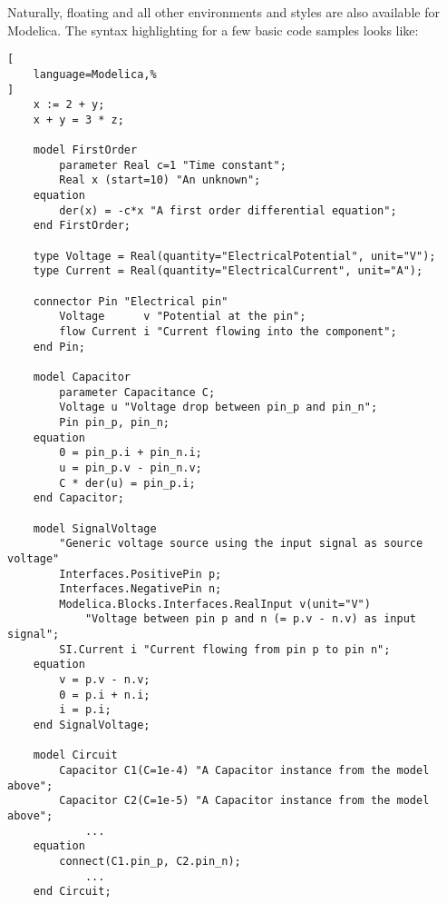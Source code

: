 Naturally, floating and all other environments and styles are also available for
Modelica.
The syntax highlighting for a few basic code samples \autocite{wikipedia_modelica_2020} looks like:

\begin{lstlisting}[
    language=Modelica,%
]
    x := 2 + y;
    x + y = 3 * z;

    model FirstOrder
        parameter Real c=1 "Time constant";
        Real x (start=10) "An unknown";
    equation
        der(x) = -c*x "A first order differential equation";
    end FirstOrder;

    type Voltage = Real(quantity="ElectricalPotential", unit="V");
    type Current = Real(quantity="ElectricalCurrent", unit="A");

    connector Pin "Electrical pin"
        Voltage      v "Potential at the pin";
        flow Current i "Current flowing into the component";
    end Pin;

    model Capacitor
        parameter Capacitance C;
        Voltage u "Voltage drop between pin_p and pin_n";
        Pin pin_p, pin_n;
    equation
        0 = pin_p.i + pin_n.i;
        u = pin_p.v - pin_n.v;
        C * der(u) = pin_p.i;
    end Capacitor;

    model SignalVoltage
        "Generic voltage source using the input signal as source voltage"
        Interfaces.PositivePin p;
        Interfaces.NegativePin n;
        Modelica.Blocks.Interfaces.RealInput v(unit="V") 
            "Voltage between pin p and n (= p.v - n.v) as input signal";
        SI.Current i "Current flowing from pin p to pin n";
    equation
        v = p.v - n.v;
        0 = p.i + n.i;
        i = p.i;
    end SignalVoltage;

    model Circuit
        Capacitor C1(C=1e-4) "A Capacitor instance from the model above";
        Capacitor C2(C=1e-5) "A Capacitor instance from the model above";
            ...
    equation
        connect(C1.pin_p, C2.pin_n);
            ...
    end Circuit;
\end{lstlisting}
